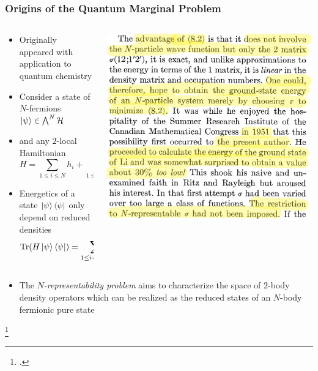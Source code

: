 \documentclass[
    9pt,
    hyperref={bookmarks=false, colorlinks=false}, %
    xcolor={dvipsnames},
]{beamer}
\DeclareMathOperator{\Tr}{Tr}
\begin{document}
\begin{frame}
    \frametitle{Origins of the Quantum Marginal Problem}
    \begin{columns}
        \begin{column}{0.6\textwidth}
            \begin{itemize}
                \item Originally appeared with application to quantum chemistry\footnotemark{}
                \item Consider a state of $N$-fermions $\ket{\psi} \in \bigwedge^N \mathcal H$
                \item and any $2$-local Hamiltonian
                    \[ H = \sum_{1 \leq i \leq N} h_i + \sum_{1 \leq i < j \leq N} h_{ij} \]
                \item Energetics of a state $\ket{\psi}\bra{\psi}$ only depend on reduced densities
                    \[ \Tr ( H \ket{\psi}\bra{\psi} ) = \sum_{1 \leq i < j \leq N} \Tr ( \tilde h_{ij} \rho_{ij} ) \]
            \end{itemize}
        \end{column}
        \begin{column}{0.4\textwidth}
            \begin{alertblock}{}
                \includegraphics[width=\textwidth]{figures/coleman.png}
                \hspace*{}
            \end{alertblock}
        \end{column}
    \end{columns}
    \begin{itemize}
        \item The \textit{$N$-representability problem} aims to characterize the space of $2$-body density operators which can be realized as the reduced states of an $N$-body fermionic pure state
    \end{itemize}
    \footcitetext{coleman1963structure}
\end{frame}
\end{document}
